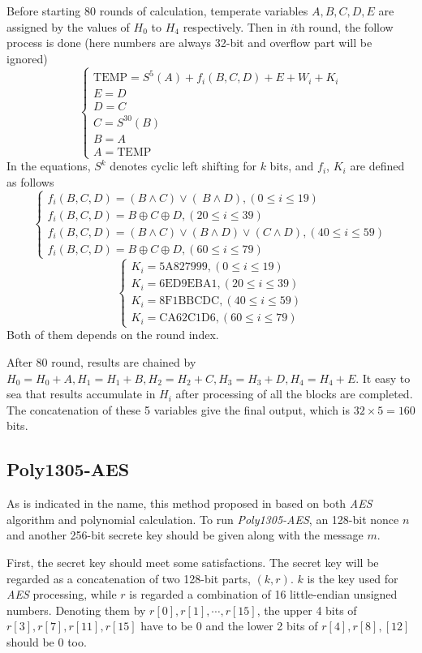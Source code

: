 Before starting 80 rounds of calculation, temperate variables $A, B, C, D, E$ 
are assigned by the values of $H_0$ to $H_4$ respectively. 
Then in $i$th round, the follow process is done 
(here numbers are always 32-bit and overflow part will be ignored)
$$
\begin{cases}
\text{TEMP}=S^5(A)+f_i(B, C, D)+E+W_i+K_i\\
E=D\\D=C\\C=S^{30}(B)\\B=A\\A=\text{TEMP}
\end{cases}
$$
In the equations, $S^k$ denotes cyclic left shifting for $k$ bits, and $f_i$, $K_i$ 
are defined as follows 
$$
\begin{cases}
f_i(B,C,D)=(B\land C)\vee(~B\land D), (0\le i\le 19)\\
f_i(B,C,D)=B\oplus C\oplus D, (20\le i\le 39)\\
f_i(B,C,D)=(B\land C)\vee(B\land D)\vee(C\land D), (40\le i\le 59)\\
f_i(B,C,D)=B\oplus C\oplus D, (60\le i\le 79)
\end{cases}
$$
$$
\begin{cases}
K_i=\text{5A827999}, (0\le i\le19)\\
K_i=\text{6ED9EBA1}, (20\le i\le39)\\
K_i=\text{8F1BBCDC}, (40\le i\le59)\\
K_i=\text{CA62C1D6}, (60\le i\le79)
\end{cases}
$$
Both of them depends on the round index. 

After 80 round, results are chained by $H_0=H_0+A, H_1=H_1+B, H_2=H_2+C, H_3=H_3+D, 
H_4=H_4+E$. It easy to sea that results accumulate in $H_i$ after processing of all 
the blocks are completed. 
The concatenation of these 5 variables give the final output, which is $32\times5=160$ bits. 
\subsection{Poly1305-AES}
As is indicated in the name, this method proposed in \cite{Poly1305} 
based on both \emph{AES} algorithm and polynomial calculation. 
To run \emph{Poly1305-AES}, an 128-bit nonce $n$ and another 256-bit secrete key 
should be given along with the message $m$. 

First, the secret key should meet some satisfactions. 
The secret key will be regarded as a concatenation of two 128-bit parts, 
$(k, r)$. $k$ is the key used for \emph{AES} processing, 
while $r$ is regarded a combination of 16 little-endian unsigned numbers. 
Denoting them by $r[0], r[1], \cdots, r[15]$, the upper 4 bits of 
$r[3], r[7], r[11], r[15]$ have to be 0 and the lower 2 bits of 
$r[4], r[8], [12]$ should be 0 too. 

